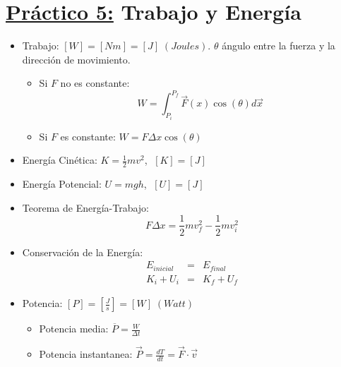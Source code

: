 \documentclass[12pt,a4paper]{article}
\begin{document}
	\section*{\underline{Práctico 5:} Trabajo y Energía}
		\begin{multicols}{2}
			\begin{itemize}
				\item Trabajo: $[W] = [Nm] = [J] \; (Joules)$. $\theta$ ángulo entre la fuerza y la dirección de movimiento.
					\begin{itemize}
						\item Si $F$ no es constante:
							\[
								W = \int_{P_{i}}^{P_{f}} \vec{F}(x) \cos(\theta)d\vec{x}
							\]
						\item Si $F$ es constante: $W = F \Delta x \cos(\theta)$
					\end{itemize}
				\item Energía Cinética: $K = \frac{1}{2} m v^{2}$, $\; [K] = [J]$
				\item Energía Potencial: $U = mgh$, $\; [U] = [J]$
				\item Teorema de Energía-Trabajo:
					\[
						F \Delta x = \frac{1}{2} m v_{f}^{2} - \frac{1}{2} m v_{i}^{2}
					\]
				\item Conservación de la Energía:
					\begin{eqnarray*}
						E_{inicial} &=& E_{final} \\
						K_{i} + U_{i} &=& K_{f} + U_{f}
					\end{eqnarray*}

				\item Potencia: $[P] = [\frac{J}{s}] = [W] \; (Watt)$
					\begin{itemize}
						\item Potencia media: $\overline{P} = \frac{W}{\Delta t}$
						\item Potencia instantanea: $\vec{P} = \frac{dT}{dt} = \vec{F} \cdot \vec{v}$
					\end{itemize}
			\end{itemize}
		\end{multicols}
\end{document}
